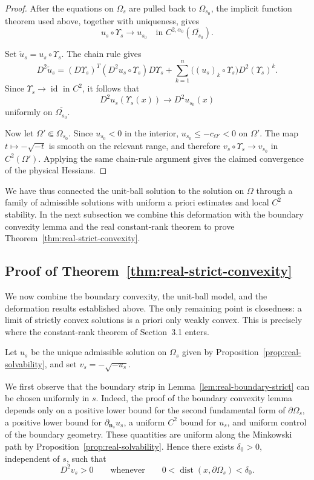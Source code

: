 \documentclass{article}
\numberwithin{equation}{section}
\begin{document}
\begin{proof}
After the equations on $\Omega_s$ are pulled back to
$\Omega_{s_0}$, the implicit function theorem used above, together
with uniqueness, gives
\[
u_s\circ\Upsilon_s\to u_{s_0}
\quad\text{in }C^{2,\alpha_0}(\overline{\Omega_{s_0}}).
\]

Set $\widetilde u_s=u_s\circ\Upsilon_s$. The chain rule gives
\[
D^2\widetilde u_s
=
(D\Upsilon_s)^T
(D^2u_s\circ\Upsilon_s)
D\Upsilon_s
+
\sum_{k=1}^n
\bigl((u_s)_k\circ\Upsilon_s\bigr)
D^2(\Upsilon_s)^k.
\]
Since $\Upsilon_s\to\operatorname{id}$ in $C^2$, it follows that
\[
D^2u_s(\Upsilon_s(x))
\longrightarrow D^2u_{s_0}(x)
\]
uniformly on $\overline{\Omega_{s_0}}$.

Now let $\Omega'\Subset\Omega_{s_0}$. Since
$u_{s_0}<0$ in the interior, $u_{s_0}\le-c_{\Omega'}<0$ on
$\Omega'$. The map $t\mapsto-\sqrt{-t}$ is smooth on the relevant
range, and therefore
$v_s\circ\Upsilon_s\to v_{s_0}$ in $C^2(\Omega')$. Applying the same
chain-rule argument gives the claimed convergence of the physical
Hessians.
\end{proof}

We have thus connected the unit-ball solution to the solution on
$\Omega$ through a family of admissible solutions with uniform
a priori estimates and local $C^2$ stability. In the next subsection
we combine this deformation with the boundary convexity lemma and
the real constant-rank theorem to prove
Theorem~\ref{thm:real-strict-convexity}.
\subsection{Proof of Theorem~\ref{thm:real-strict-convexity}}
\label{subsubsec:proof-real-strict}

We now combine the boundary convexity, the unit-ball model, and the
deformation results established above. The only remaining point is
closedness: a limit of strictly convex solutions is a priori only
weakly convex. This is precisely where the constant-rank theorem of
Section~3.1 enters.

Let $u_s$ be the unique admissible solution on $\Omega_s$ given by
Proposition~\ref{prop:real-solvability}, and set
$v_s=-\sqrt{-u_s}$.

We first observe that the boundary strip in
Lemma~\ref{lem:real-boundary-strict} can be chosen uniformly in $s$.
Indeed, the proof of the boundary convexity lemma depends only on a
positive lower bound for the second fundamental form of
$\partial\Omega_s$, a positive lower bound for
$\partial_{\mathbf n_s}u_s$, a uniform $C^2$ bound for $u_s$, and
uniform control of the boundary geometry. These quantities are
uniform along the Minkowski path by
Proposition~\ref{prop:real-solvability}. Hence there exists
$\delta_0>0$, independent of $s$, such that
\begin{equation}\label{eq:uniform-boundary-strip}
D^2v_s>0
\qquad\text{whenever}\qquad
0<\operatorname{dist}(x,\partial\Omega_s)<\delta_0.
\end{equation}
\end{document}
